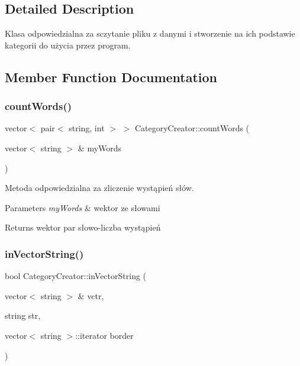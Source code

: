 \subsection{Detailed Description}
Klasa odpowiedzialna za sczytanie pliku z danymi i stworzenie na ich podstawie kategorii do użycia przez program. 

\subsection{Member Function Documentation}
\mbox{\label{class_category_creator_af360522860174df13d38103f06024406}} 
\subsubsection{\texorpdfstring{countWords()}{countWords()}}
{\footnotesize\ttfamily vector$<$ pair$<$ string, int $>$ $>$ Category\+Creator\+::count\+Words (\begin{DoxyParamCaption}\item[{vector$<$ string $>$ \&}]{my\+Words }\end{DoxyParamCaption})}



Metoda odpowiedzialna za zliczenie wystąpień słów. 


\begin{DoxyParams}{Parameters}
{\em my\+Words} & wektor ze słowami \\
\hline
\end{DoxyParams}
\begin{DoxyReturn}{Returns}
wektor par słowo-\/liczba wystąpień 
\end{DoxyReturn}
\mbox{\label{class_category_creator_a2c8b4f34e75ed4f6fa94ebe47a14b86d}} 
\subsubsection{\texorpdfstring{inVectorString()}{inVectorString()}}
{\footnotesize\ttfamily bool Category\+Creator\+::in\+Vector\+String (\begin{DoxyParamCaption}\item[{vector$<$ string $>$ \&}]{vctr,  }\item[{string}]{str,  }\item[{vector$<$ string $>$\+::iterator}]{border }\end{DoxyParamCaption})}




